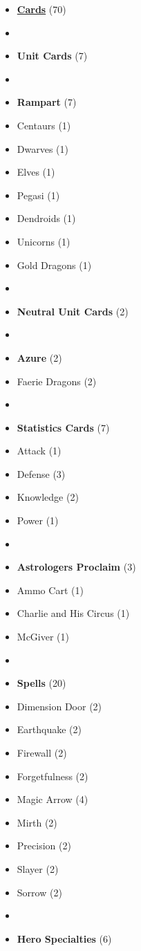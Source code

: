 \begin{multicols*}{3}
\begin{itemize}[leftmargin=0pt, label={}, noitemsep]
  \item \textbf{\normalsize{\underline{Cards}}} (70)
  \item
  \item \textbf{Unit Cards} (7)
  \item
  \item \textbf{Rampart} (7)
  \item Centaurs (1)
  \item Dwarves (1)
  \item Elves (1)
  \item Pegasi (1)
  \item Dendroids (1)
  \item Unicorns (1)
  \item Gold Dragons (1)
  \item
  \item \textbf{Neutral Unit Cards} (2)
  \item
  \item \textbf{Azure} (2)
  \item Faerie Dragons (2)
  \item
  \item \textbf{Statistics Cards} (7)
  \item Attack (1)
  \item Defense (3)
  \item Knowledge (2)
  \item Power (1)
  \item
  \item \textbf{Astrologers Proclaim} (3)
  \item Ammo Cart (1)
  \item Charlie and His Circus (1)
  \item McGiver (1)
  \item
  \item \textbf{Spells} (20)
  \item Dimension Door (2)
  \item Earthquake (2)
  \item Firewall (2)
  \item Forgetfulness (2)
  \item Magic Arrow (4)
  \item Mirth (2)
  \item Precision (2)
  \item Slayer (2)
  \item Sorrow (2)
  \item
  \item \textbf{Hero Specialties} (6)

\end{itemize}
\end{multicols*}

